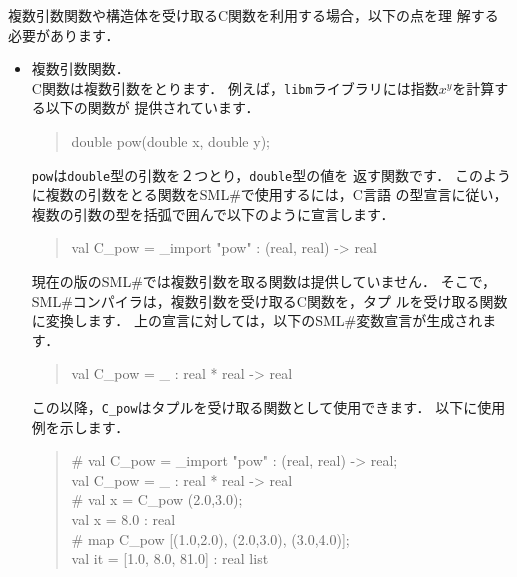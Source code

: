 \documentclass{jbook}
\newcommand{\smlsharp}{SML\#}
\newenvironment{program}{\begin{tt}\begin{quote}}{\end{quote}\end{tt}}
\begin{document}
\ifx\jp%
	複数引数関数や構造体を受け取るC関数を利用する場合，以下の点を理
解する必要があります．
\begin{itemize}
\item 複数引数関数．\\
	C関数は複数引数をとります．
	例えば，{\tt libm}ライブラリには指数$x^y$を計算する以下の関数が
提供されています．
\begin{program}
double pow(double x, double y);
\end{program}
	{\tt pow}は{\tt double}型の引数を２つとり，{\tt double}型の値を
返す関数です．
	このように複数の引数をとる関数を\smlsharp{}で使用するには，C言語
の型宣言に従い，複数の引数の型を括弧で囲んで以下のように宣言します．
\begin{program}
val C\_pow = \_import "pow" : (real, real) -> real
\end{program}
	現在の版の\smlsharp{}では複数引数を取る関数は提供していません．
	そこで，\smlsharp{}コンパイラは，複数引数を受け取るC関数を，タプ
ルを受け取る関数に変換します．
	上の宣言に対しては，以下の\smlsharp{}変数宣言が生成されます．
\begin{program}
val C\_pow = \_ : real * real -> real\\
\end{program}
	この以降，{\tt C\_pow}はタプルを受け取る関数として使用できます．
	以下に使用例を示します．
\begin{program}
\# val C\_pow = \_import "pow" : (real, real) -> real;\\
val C\_pow = \_ : real * real -> real\\
\# val x = C\_pow (2.0,3.0);\\
val x = 8.0 : real\\
\# map C\_pow [(1.0,2.0), (2.0,3.0), (3.0,4.0)];\\
val it = [1.0, 8.0, 81.0] : real list
\end{program}


\end{itemize}
\end{document}
